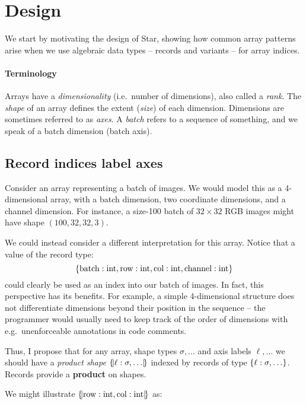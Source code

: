 \section{Design}
\label{sec:design}

We start by motivating the design of Star, showing how common array patterns arise when we use algebraic data types -- records and variants -- for array indices.

\paragraph{Terminology} Arrays have a \emph{dimensionality} (i.e.\ number of dimensions), also called a \emph{rank}.
The \emph{shape} of an array defines the extent (\emph{size}) of
each dimension. Dimensions are sometimes referred to as \emph{axes}.
A \emph{batch} refers to a sequence of something, and we speak of a batch dimension (batch axis).

\subsection{Record indices label axes}

Consider an array representing a batch of images. We would model this as a 4-dimensional array, with a batch dimension, two coordinate dimensions, and a channel dimension. For instance, a size-100 batch of $32 \times 32$ RGB images might have shape $(100, 32, 32, 3)$.

We could instead consider a different interpretation for this array. Notice that a value of the record type:
$$ \srecordtype{ \mathrm{batch}: \sint, \mathrm{row}: \sint, \mathrm{col}: \sint, \mathrm{channel}: \sint } $$
could clearly be used as an index into our batch of images. In fact, this perspective has its benefits. For example, a simple 4-dimensional structure does not differentiate dimensions beyond their position in the sequence -- the programmer would usually need to keep track of the order of dimensions with e.g.\ unenforceable annotations in code comments. 

Thus, I propose that for any array, shape types $\sigma, \dots$ and axis labels $\ell, \dots$ we should have a \textit{product shape} $\sproducttype{\ell : \sigma, \dots}$ indexed by records of type $\srecordtype{\ell : \sigma, \dots}$.
Records provide a \textbf{product} on shapes. 

We might illustrate $\sproducttype{\mathrm{row}: \sint, \mathrm{col}: \sint}$ as:
\begin{center}
\end{center}

